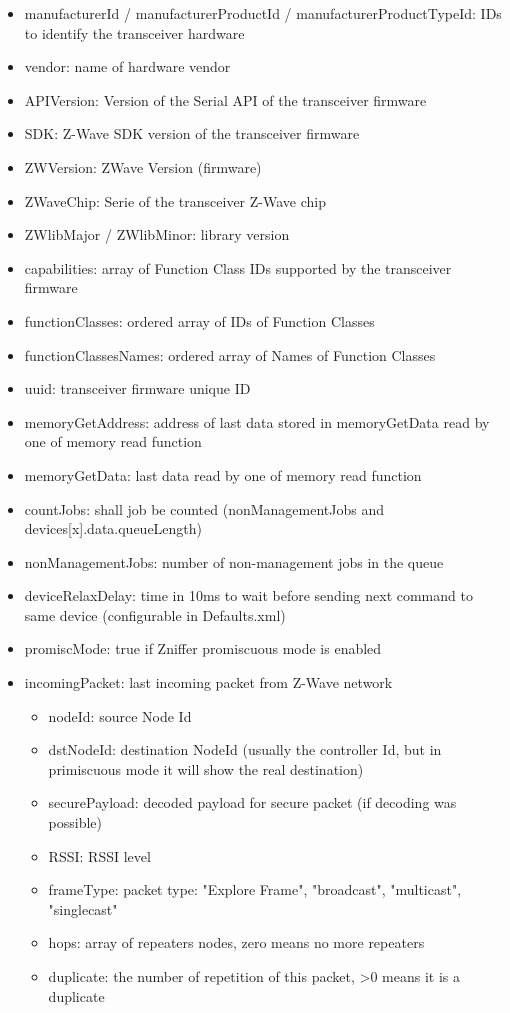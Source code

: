 \begin {itemize}
\begin {itemize}
\begin {itemize}
\item  manufacturerId / manufacturerProductId / manufacturerProductTypeId: IDs to identify the transceiver hardware
\item  vendor: name of hardware vendor
\item  APIVersion: Version of the Serial API of the transceiver firmware
\item  SDK: Z-Wave SDK version of the transceiver firmware
\item  ZWVersion: ZWave Version (firmware)
\item  ZWaveChip: Serie of the transceiver Z-Wave chip
\item  ZWlibMajor / ZWlibMinor: library version 
\item  capabilities: array of Function Class IDs supported by the transceiver firmware
\item  functionClasses: ordered array of IDs of Function Classes
\item  functionClassesNames: ordered array of Names of Function Classes
\item  uuid: \zway transceiver firmware unique ID

\item  memoryGetAddress: address of last data stored in memoryGetData read by one of memory read function
\item  memoryGetData: last data read by one of memory read function
\item  countJobs: shall job be counted (nonManagementJobs and devices[x].data.queueLength)
\item  nonManagementJobs: number of non-management jobs in the queue
\item  deviceRelaxDelay: time in 10ms to wait before sending next command to same device (configurable in Defaults.xml)
\item  promiscMode: true if Zniffer promiscuous mode is enabled
\item  incomingPacket: last incoming packet from Z-Wave network
\begin {itemize}
\item  nodeId: source Node Id
\item  dstNodeId: destination NodeId (usually the controller Id, but in primiscuous mode it will show the real destination)
\item  securePayload: decoded payload for secure packet (if decoding was possible)
\item  RSSI: RSSI level
\item  frameType: packet type: "Explore Frame", "broadcast", "multicast", "singlecast"
\item  hops: array of repeaters nodes, zero means no more repeaters
\item  duplicate: the number of repetition of this packet, >0 means it is a duplicate
\end {itemize}


\end{itemize}
\end{itemize}
\end{itemize}
